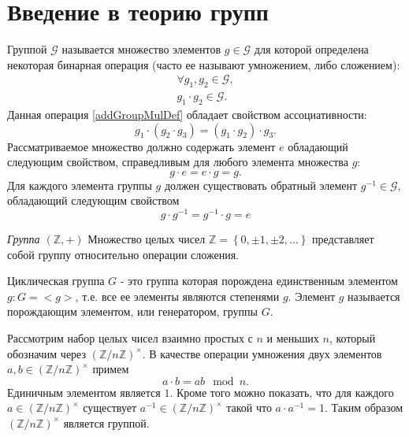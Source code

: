 \section{Введение в теорию групп}
\label{sec:add:group}
\begin{definition}
\label{def:add:group}
Группой $\mathcal{G}$ называется множество элементов $g \in
\mathcal{G}$ для которой определена 
некоторая бинарная операция (часто ее называют умножением, либо сложением):
\begin{eqnarray}
\forall g_1,g_2 \in \mathcal{G},
\nonumber \\
g_1 \cdot g_2 \in \mathcal{G}.
\label{addGroupMulDef}
\end{eqnarray}
Данная операция \autoref{addGroupMulDef} обладает свойством
ассоциативности:
\begin{equation}
g_1 \cdot \left( g_2 \cdot g_3 \right ) = 
\left( g_1 \cdot  g_2 \right ) \cdot g_3.
\nonumber
\end{equation}
Рассматриваемое множество должно содержать элемент $e$ обладающий
следующим свойством, справедливым для любого элемента множества $g$:
\begin{equation}
g \cdot e = e \cdot g = g.
\nonumber
\end{equation}
Для каждого элемента группы $g$ должен существовать обратный
элемент $g^{-1} \in \mathcal{G}$, обладающий следующим свойством
\begin{equation}
g \cdot g^{-1} = g^{-1} \cdot g = e
\nonumber
\end{equation}
\end{definition}

\begin{example}
\emph{Группа $\left(\mathbb{Z}, +\right)$}
Множество целых чисел $\mathbb{Z} = \left\{0, \pm1, \pm2,
\dots\right\}$ представляет собой группу относительно операции сложения.
\nonumber
\end{example}

\begin{definition}
Циклическая группа $G$ - это группа которая порождена единственным
элементом $g: G = <g>$, т.е. все ее элементы являются степенями $g$.
Элемент $g$ называется порождающим элементом, или генератором, группы $G$.
\label{def:add:algebra:cyclic_group}
\end{definition}

\begin{definition}
Рассмотрим набор целых чисел взаимно простых с $n$ и меньших $n$,
который обозначим через $\left(\mathbb{Z}/n\mathbb{Z}\right)^\times$. В
качестве операции умножения двух элементов $a,b \in
\left(\mathbb{Z}/n\mathbb{Z}\right)^\times$ примем
\[
a \cdot b = ab \mod n.
\]
Единичным элементом является $1$. Кроме того можно показать, что для
каждого $a \in \left(\mathbb{Z}/n\mathbb{Z}\right)^\times$
существует $a^{-1} \in \left(\mathbb{Z}/n\mathbb{Z}\right)^\times$
такой что $a \cdot a^{-1} = 1$. Таким образом
$\left(\mathbb{Z}/n\mathbb{Z}\right)^\times$ является группой.
\label{def:add:algebra:mult_group}
\end{definition}

